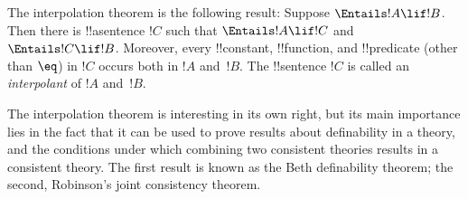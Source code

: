 \documentclass[../../../include/open-logic-section]{subfiles}
\begin{document}


The interpolation theorem is the following result: Suppose
$\Entails !A \lif !B$. Then there is !!a{sentence} $!C$ such that
$\Entails !A \lif !C$ and $\Entails !C \lif !B$.  Moreover, every
!!{constant}, !!{function}, and !!{predicate} (other than $\eq$) in
$!C$ occurs both in $!A$ and~$!B$. The !!{sentence} $!C$ is called an
\emph{interpolant} of $!A$ and~$!B$.

The interpolation theorem is interesting in its own right, but its
main importance lies in the fact that it can be used to prove results
about definability in a theory, and the conditions under which
combining two consistent theories results in a consistent theory.  The
first result is known as the Beth definability theorem; the second,
Robinson's joint consistency theorem.
\end{document}
